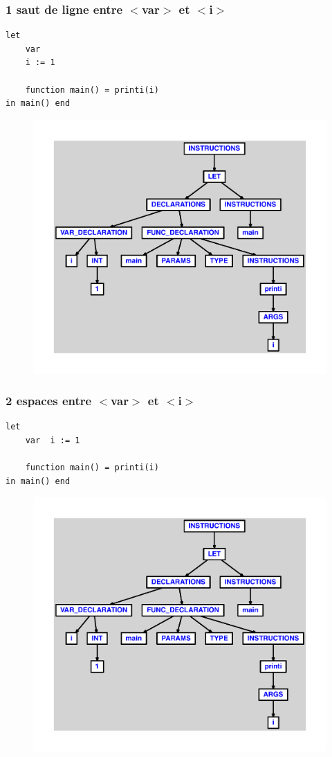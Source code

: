 \documentclass{article}
\begin{document}
\subsubsection{1 saut de ligne entre $ < $var$ > $ et $ < $i$ > $}
\begin{lstlisting}
let
	var
	i := 1

	function main() = printi(i)
in main() end
\end{lstlisting}
\newpage
\begin{figure}[H]
\centering
\includegraphics[max width=\textwidth]{ast/ast_185.pdf}
\end{figure}
\newpage
\subsubsection{2 espaces entre $ < $var$ > $ et $ < $i$ > $}
\begin{lstlisting}
let
	var  i := 1

	function main() = printi(i)
in main() end
\end{lstlisting}
\newpage
\begin{figure}[H]
\centering
\includegraphics[max width=\textwidth]{ast/ast_186.pdf}
\end{figure}
\newpage
\end{document}
